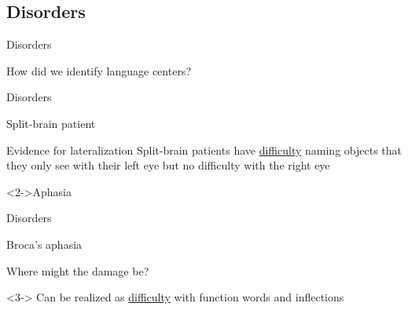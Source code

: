 \documentclass{beamer}
\newcommand{\subtwothree}{Disorders}
\begin{document}
    \subsection{\subtwothree}
      \begin{frame}{\subtwothree}
        \begin{block}{How did we identify language centers?}
        \end{block}
      \end{frame}

      \begin{frame}{\subtwothree}
        \begin{alertblock}{Split-brain patient}
          
        \end{alertblock}
        \begin{block}{Evidence for lateralization}
          Split-brain patients have \href{https://youtu.be/ZMLzP1VCANo?t=96}{difficulty} naming objects that they only see with their left eye but no difficulty with the right eye
        \end{block}
        \begin{alertblock}<2->{Aphasia}
          
        \end{alertblock}
      \end{frame}

      \begin{frame}{\subtwothree}
        \begin{alertblock}{Broca's aphasia}
          
        \end{alertblock}
        \begin{block}{Where might the damage be?}
        \end{block}
        \begin{example}<3->
          Can be realized as \href{https://youtu.be/JWC-cVQmEmY?t=21}{difficulty} with function words and inflections
        \end{example}
      \end{frame}
\end{document}
